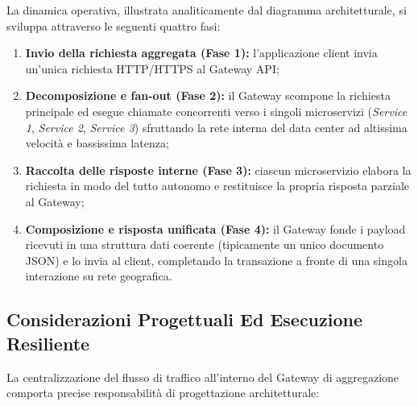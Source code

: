 \documentclass[11pt, a4paper]{article}
\begin{document}

La dinamica operativa, illustrata analiticamente dal diagramma architetturale, si sviluppa attraverso le seguenti quattro fasi:
\begin{enumerate}[noitemsep]
    \item \textbf{Invio della richiesta aggregata (Fase 1):} l'applicazione client invia un'unica richiesta HTTP/HTTPS al Gateway API;
    \item \textbf{Decomposizione e fan-out (Fase 2):} il Gateway scompone la richiesta principale ed esegue chiamate concorrenti verso i singoli microservizi (\emph{Service 1}, \emph{Service 2}, \emph{Service 3}) sfruttando la rete interna del data center ad altissima velocità e bassissima latenza;
    \item \textbf{Raccolta delle risposte interne (Fase 3):} ciascun microservizio elabora la richiesta in modo del tutto autonomo e restituisce la propria risposta parziale al Gateway;
    \item \textbf{Composizione e risposta unificata (Fase 4):} il Gateway fonde i payload ricevuti in una struttura dati coerente (tipicamente un unico documento JSON) e lo invia al client, completando la transazione a fronte di una singola interazione su rete geografica.
\end{enumerate}

\subsection{Considerazioni Progettuali Ed Esecuzione Resiliente}

La centralizzazione del flusso di traffico all'interno del Gateway di aggregazione comporta precise responsabilità di progettazione architetturale:
\end{document}

